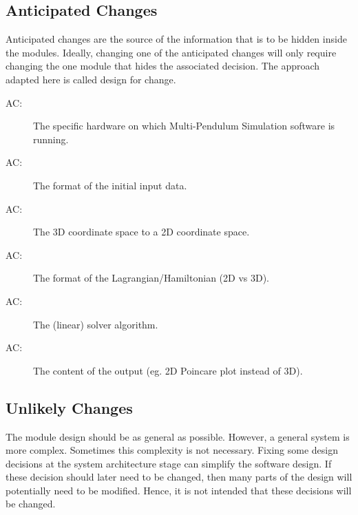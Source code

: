 \documentclass[12pt, titlepage]{article}
\newcounter{acnum}
\newcommand{\actheacnum}{AC\theacnum}
\newcommand{\progname}{Multi-Pendulum Simulation }
\begin{document}
\subsection{Anticipated Changes} \label{SecAchange}

Anticipated changes are the source of the information that is to be hidden
inside the modules. Ideally, changing one of the anticipated changes will only
require changing the one module that hides the associated decision. The approach
adapted here is called design for
change.

\begin{description}
\item[ \actheacnum \label{acHardware}:] The specific
  hardware on which \progname software is running.
\item[ \actheacnum \label{acFormat}:] The format of the
  initial input data.
\item[ \actheacnum \label{ac3d}:] The 3D coordinate space 
to a 2D coordinate space.
\item[ \actheacnum \label{acCoord}:] The format of the
  Lagrangian/Hamiltonian (2D vs 3D).
\item[ \actheacnum \label{acLinear}:] The (linear)
  solver algorithm.
\item[ \actheacnum \label{acCont}:] The content of the
  output (eg. 2D Poincare plot instead of 3D).
\end{description}

\subsection{Unlikely Changes} \label{SecUchange}

The module design should be as general as possible. However, a general system is
more complex. Sometimes this complexity is not necessary. Fixing some design
decisions at the system architecture stage can simplify the software design. If
these decision should later need to be changed, then many parts of the design
will potentially need to be modified. Hence, it is not intended that these
decisions will be changed.
\end{document}
